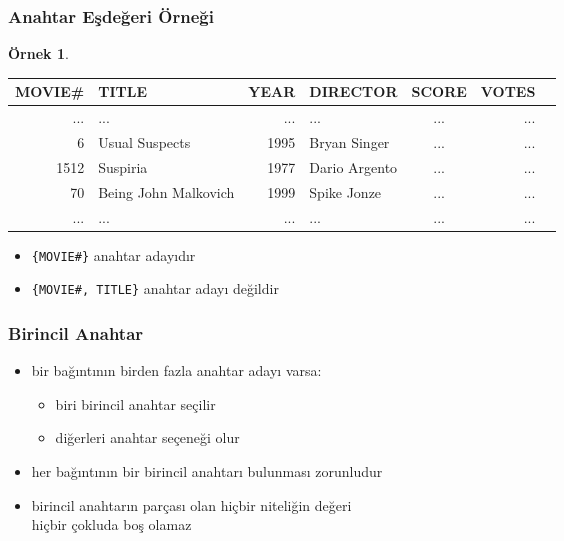 \documentclass[dvipsnames]{beamer}
\theoremstyle{definition}
\theoremstyle{example}
\newtheorem{ornek}[theorem]{Örnek}
\theoremstyle{plain}
\begin{document}
\begin{frame}
  \frametitle{Anahtar Eşdeğeri Örneği}

  \begin{ornek}
    \begin{tiny}
    \begin{table}
      \begin{tabular}{|r|l|r|l|c|r|r|}\hline
MOVIE\# & TITLE                & YEAR & DIRECTOR      & SCORE & VOTES\\\hline\hline
    ... & ...                  &  ... & ...           & ...   &   ...\\\hline
      6 & Usual Suspects       & 1995 & Bryan Singer  & ...   &   ...\\\hline
   1512 & Suspiria             & 1977 & Dario Argento & ...   &   ...\\\hline
     70 & Being John Malkovich & 1999 & Spike Jonze   & ...   &   ...\\\hline
    ... & ...                  &  ... & ...           & ...   &   ...\\\hline
      \end{tabular}
    \end{table}
    \end{tiny}

    \pause
    \begin{itemize}
      \item \texttt{\{MOVIE\#\}} anahtar adayıdır
      \item \texttt{\{MOVIE\#, TITLE\}} anahtar adayı değildir
    \end{itemize}
  \end{ornek}
\end{frame}

\begin{frame}
  \frametitle{Birincil Anahtar}

  \begin{itemize}
    \item bir bağıntının birden fazla anahtar adayı varsa:
    \begin{itemize}
      \item biri \alert{birincil anahtar} seçilir
      \item diğerleri \alert{anahtar seçeneği} olur
    \end{itemize}

    \pause
    \item her bağıntının bir birincil anahtarı bulunması zorunludur

    \pause
    \item birincil anahtarın parçası olan hiçbir niteliğin değeri\\
      hiçbir çokluda boş olamaz
  \end{itemize}
\end{frame}
\end{document}
